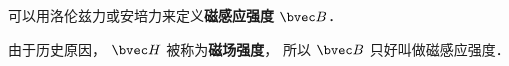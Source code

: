 
\begin{issues}
\issueDraft
\end{issues}

可以用洛伦兹力或安培力来定义\textbf{磁感应强度} $\bvec B$．

由于历史原因， $\bvec H$ 被称为\textbf{磁场强度}， 所以 $\bvec B$ 只好叫做磁感应强度．
